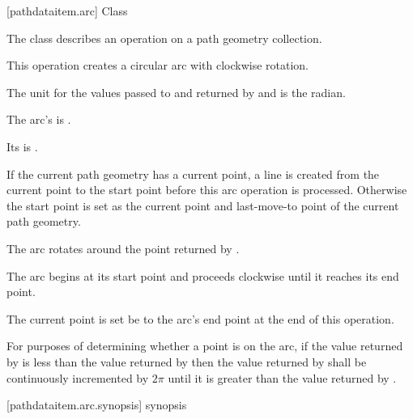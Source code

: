  [pathdataitem.arc] {Class }

\pnum
{}
The class  describes an operation on a path geometry collection.

\pnum
This operation creates a circular arc with clockwise rotation.

\pnum
The unit for the values passed to and returned by  and  is the radian.

\pnum
The arc's  is .

\pnum
Its  is .

\pnum
If the current path geometry has a current point, a line is created from the current point to the start point before this arc operation is processed. Otherwise the start point is set as the current point and last-move-to point of the current path geometry.

\pnum
The arc rotates around the point returned by .

\pnum
The arc begins at its start point and proceeds clockwise until it reaches its end point.

\pnum
The current point is set be to the arc's end point at the end of this operation.

\pnum
For purposes of determining whether a point is on the arc, if the value returned by  is less than the value returned by  then the value returned by  shall be continuously incremented by $2\pi$ until it is greater than the value returned by .

 [pathdataitem.arc.synopsis] { synopsis}

